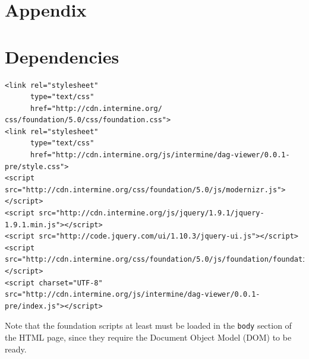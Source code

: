 \documentclass[10pt,a4paper,twocolumn]{article}
\begin{document}
\nocite{*}
{\small
}

\clearpage
\section*{Appendix}
\appendix

\section{Dependencies}
\label{sec:deps}

\lstset{language=HTML}
\begin{lstlisting}
<link rel="stylesheet"
      type="text/css"
      href="http://cdn.intermine.org/
css/foundation/5.0/css/foundation.css">
<link rel="stylesheet"
      type="text/css"
      href="http://cdn.intermine.org/js/intermine/dag-viewer/0.0.1-pre/style.css">
<script src="http://cdn.intermine.org/css/foundation/5.0/js/modernizr.js"></script>
<script src="http://cdn.intermine.org/js/jquery/1.9.1/jquery-1.9.1.min.js"></script>
<script src="http://code.jquery.com/ui/1.10.3/jquery-ui.js"></script>
<script src="http://cdn.intermine.org/css/foundation/5.0/js/foundation/foundation.js"></script>
<script charset="UTF-8" src="http://cdn.intermine.org/js/intermine/dag-viewer/0.0.1-pre/index.js"></script>
\end{lstlisting}

Note that the foundation scripts at least must be loaded in the
\texttt{body} section of the HTML page, since they require the
Document Object Model (DOM) to be ready.



\end{document}
